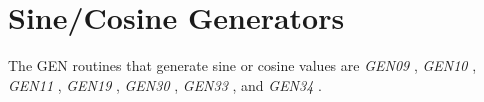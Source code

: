 \begin{comment}
\documentclass[10pt]{article}
\usepackage{fullpage, graphicx, url}
\setlength{\parskip}{1ex}
\setlength{\parindent}{0ex}
\title{Sine/Cosine Generators}



\begin{tabular}{ccc}
The Alternative Csound Reference Manual & & \\
Previous &The Standard Numeric Score &Next

\end{tabular}

\end{comment}
\section{Sine/Cosine Generators}


  The GEN routines that generate sine or cosine values are \emph{GEN09}
, \emph{GEN10}
, \emph{GEN11}
, \emph{GEN19}
, \emph{GEN30}
, \emph{GEN33}
, and \emph{GEN34}
. 


\begin{comment}
\begin{tabular}{lcr}
Previous &Home &Next \\
Score Statements &Up &Line/Exponential Segment Generators

\end{tabular}



\end{comment}
